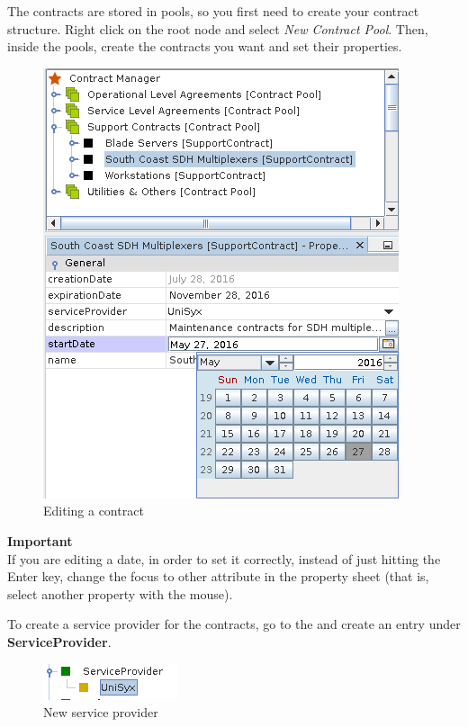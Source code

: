\documentclass[a4paper]{article}
\begin{document}
		The contracts are stored in pools, so you first need to create your contract structure. Right click on the root node and select \textit{New Contract Pool}. Then, inside the pools, create the contracts you want and set their properties.
		\begin{figure}[h!]
			\centering
			\includegraphics[width=0.4\linewidth]{img/contract_manager_editing_properties.png}
			\caption{Editing a contract}
			\label{fig:contract_manager_editing_properties}
		\end{figure}		
		\begin{framed} {\large \textbf{Important}}\\
			If you are editing a date, in order to set it correctly, instead of just hitting the Enter key, change the focus to other attribute in the property sheet (that is, select another property with the mouse).							
		\end{framed}
		To create a service provider for the contracts, go to the \textbf{} and create an entry under \textbf{ServiceProvider}.
		\begin{figure}[h!]
			\centering
			\includegraphics[width=0.2\linewidth]{img/contract_manager_service_providers.png}
			\caption{New service provider}
			\label{fig:contract_manager_service_providers}
		\end{figure}
		
\end{document}
